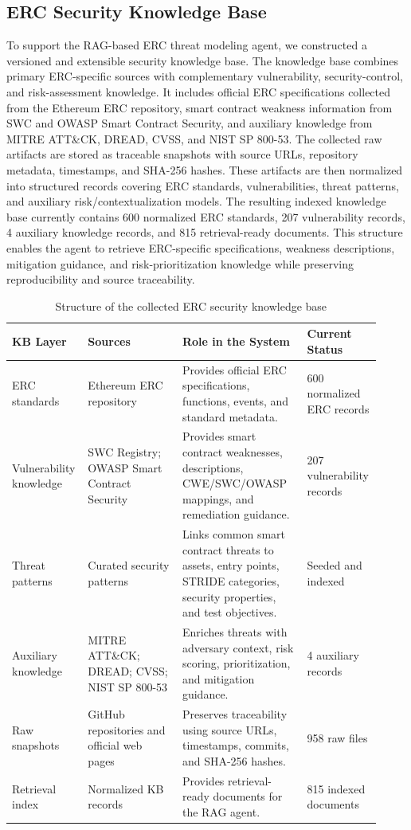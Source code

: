 \subsection{ERC Security Knowledge Base}
\label{subsec:erc-security-kb}

To support the RAG-based ERC threat modeling agent, we constructed a versioned and extensible security knowledge base. The knowledge base combines primary ERC-specific sources with complementary vulnerability, security-control, and risk-assessment knowledge. It includes official ERC specifications collected from the Ethereum ERC repository, smart contract weakness information from SWC and OWASP Smart Contract Security, and auxiliary knowledge from MITRE ATT\&CK, DREAD, CVSS, and NIST SP 800-53. The collected raw artifacts are stored as traceable snapshots with source URLs, repository metadata, timestamps, and SHA-256 hashes. These artifacts are then normalized into structured records covering ERC standards, vulnerabilities, threat patterns, and auxiliary risk/contextualization models. The resulting indexed knowledge base currently contains 600 normalized ERC standards, 207 vulnerability records, 4 auxiliary knowledge records, and 815 retrieval-ready documents. This structure enables the agent to retrieve ERC-specific specifications, weakness descriptions, mitigation guidance, and risk-prioritization knowledge while preserving reproducibility and source traceability.

\begin{table}[t]
\centering
\caption{Structure of the collected ERC security knowledge base}
\label{tab:erc-security-kb}
\begin{tabular}{p{0.18\linewidth} p{0.25\linewidth} p{0.33\linewidth} p{0.16\linewidth}}
\hline
\textbf{KB Layer} & \textbf{Sources} & \textbf{Role in the System} & \textbf{Current Status} \\
\hline
ERC standards & Ethereum ERC repository & Provides official ERC specifications, functions, events, and standard metadata. & 600 normalized ERC records \\
Vulnerability knowledge & SWC Registry; OWASP Smart Contract Security & Provides smart contract weaknesses, descriptions, CWE/SWC/OWASP mappings, and remediation guidance. & 207 vulnerability records \\
Threat patterns & Curated security patterns & Links common smart contract threats to assets, entry points, STRIDE categories, security properties, and test objectives. & Seeded and indexed \\
Auxiliary knowledge & MITRE ATT\&CK; DREAD; CVSS; NIST SP 800-53 & Enriches threats with adversary context, risk scoring, prioritization, and mitigation guidance. & 4 auxiliary records \\
Raw snapshots & GitHub repositories and official web pages & Preserves traceability using source URLs, timestamps, commits, and SHA-256 hashes. & 958 raw files \\
Retrieval index & Normalized KB records & Provides retrieval-ready documents for the RAG agent. & 815 indexed documents \\
\hline
\end{tabular}
\end{table}
